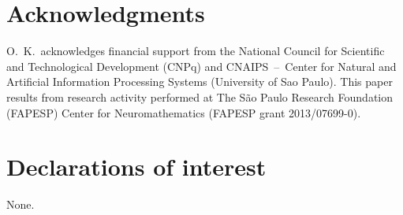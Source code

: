 \documentclass[final,3p,times]{elsarticle}
\begin{document}
\section*{Acknowledgments}
O.~K.~acknowledges financial support from the National Council for Scientific and Technological Development (CNPq) and CNAIPS~--~Center
for Natural and Artificial Information Processing Systems (University of Sao Paulo). This
paper results from research activity performed at The S\~ao Paulo Research Foundation (FAPESP) Center for Neuromathematics (FAPESP grant 2013/07699-0).

\section*{Declarations of interest} 
None.

%


\end{document}

